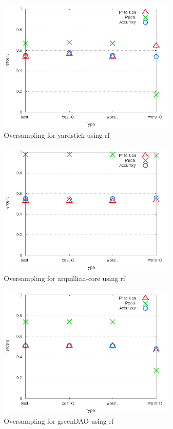 \begin{figure}[!ht]
    \centering
        \includegraphics[width=0.8\textwidth]{images/rf/test_4/yardstick_sample_range}
        \caption{Oversampling for yardstick using \gls{rf}}
        \label{fig:test_4_yardstick_rf}
\end{figure}

\begin{figure}[!ht]
    \centering
        \includegraphics[width=0.8\textwidth]{images/rf/test_4/arquillian-core_sample_range}
        \caption{Oversampling for arquillian-core using \gls{rf}}
        \label{fig:test_4_arquillian-core_rf}
\end{figure}

\begin{figure}[!ht]
    \centering
        \includegraphics[width=0.8\textwidth]{images/rf/test_4/greenDAO_sample_range}
    \caption{Oversampling for greenDAO using \gls{rf}}
    \label{fig:test_4_greenDAO_rf}
\end{figure}

